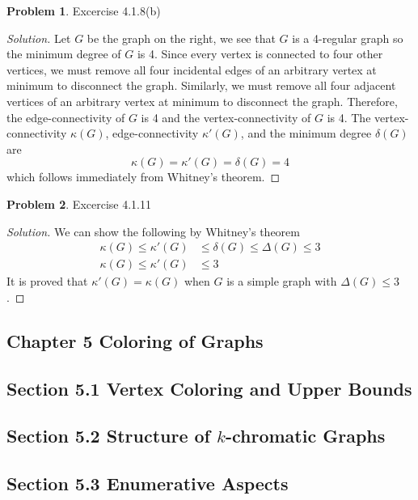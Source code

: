 \documentclass[12pt]{article}
\theoremstyle{definition}
\newtheorem{problem}{Problem}
\newenvironment*{solution}{\begin{proof}[Solution]}{\end{proof}}
\begin{document}
\begin{problem}
    Excercise 4.1.8(b)
\end{problem}
\begin{solution}
    Let \(G\) be the graph on the right, we see that \(G\) is a 4-regular graph so the minimum degree of \(G\) is 4.
    Since every vertex is connected to four other vertices,
    we must remove all four incidental edges of an arbitrary vertex at minimum to disconnect the graph.
    Similarly, we must remove all four adjacent vertices of an arbitrary vertex at minimum to disconnect the graph.
    Therefore, the edge-connectivity of \(G\) is 4 and the vertex-connectivity of \(G\) is 4.
    The vertex-connectivity \(\kappa(G)\), edge-connectivity \(\kappa'(G)\), and the minimum degree \(\delta(G)\) are
    \[\kappa(G) = \kappa'(G) = \delta(G) = 4\] which follows immediately from Whitney's theorem.
\end{solution}

\begin{problem}
    Excercise 4.1.11
\end{problem}
\begin{solution}
    We can show the following by Whitney's theorem
    \begin{align*}
        \kappa(G) \leq \kappa'(G) &\leq \delta(G) \leq \Delta(G) \leq 3 \\
        \kappa(G) \leq \kappa'(G) &\leq 3
    \end{align*}
    It is proved that \(\kappa'(G)=\kappa(G)\) when \(G\) is a simple graph with \(\Delta(G)\leq3\).
\end{solution}

\subsection*{Chapter 5 Coloring of Graphs}
\subsection*{Section 5.1 Vertex Coloring and Upper Bounds}
\subsection*{Section 5.2 Structure of \(k\)-chromatic Graphs}
\subsection*{Section 5.3 Enumerative Aspects}
\end{document}
